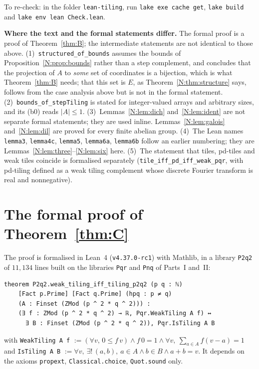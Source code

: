 \documentclass[11pt,a4paper]{amsart}
\theoremstyle{definition}
\theoremstyle{remark}
\newcommand{\lean}[1]{\texttt{#1}}
\begin{document}
\medskip
\noindent To re-check: in the folder \texttt{lean-tiling}, run \texttt{lake exe cache get}, \texttt{lake build}
and \texttt{lake env lean Check.lean}.

\medskip
{\sloppy\noindent\textbf{Where the text and the formal statements differ.} The formal proof is a proof of
Theorem~\ref{thm:B}; the intermediate statements are not identical to those above.
(1)~\lean{structured\_of\_bounds} assumes the bounds of Proposition~\ref{N:prop:bounds} rather than a step
complement, and concludes that the projection of $A$ to \emph{some} set of coordinates is a bijection, which is
what Theorem~\ref{thm:B} needs; that this set is $E$, as Theorem~\ref{N:thm:structure} says, follows from the
case analysis above but is not in the formal statement.
(2)~\lean{bounds\_of\_stepTiling} is stated for integer-valued arrays and arbitrary sizes, and its (b0) reads
$|A|\le 1$.
(3)~Lemmas~\ref{N:lem:dich} and~\ref{N:lem:ident} are not separate formal statements; they are used inline.
Lemmas~\ref{N:lem:galois} and~\ref{N:lem:dil} are proved for every finite abelian group.
(4)~The Lean names \lean{lemma3}, \lean{lemma4c}, \lean{lemma5}, \lean{lemma6a}, \lean{lemma6b} follow an earlier
numbering; they are Lemmas~\ref{N:lem:three}--\ref{N:lem:six} here.
(5)~The statement that tiles, pd-tiles and weak tiles coincide is formalised separately
(\lean{tile\_iff\_pd\_iff\_weak\_pqr}, with pd-tiling defined as a weak tiling complement whose discrete Fourier
transform is real and nonnegative).\par}

\section{The formal proof of Theorem~\ref{thm:C}}\label{C:sec:lean}

The proof is formalised in Lean~4 (\texttt{v4.37.0-rc1}) with Mathlib, in a library \lean{P2q2} of $11{,}134$
lines built on the libraries \lean{Pqr} and \lean{Pnq} of Parts~I and~II:
\begin{verbatim}
theorem P2q2.weak_tiling_iff_tiling_p2q2 (p q : ℕ)
    [Fact p.Prime] [Fact q.Prime] (hpq : p ≠ q)
    (A : Finset (ZMod (p ^ 2 * q ^ 2))) :
    (∃ f : ZMod (p ^ 2 * q ^ 2) → ℝ, Pqr.WeakTiling A f) ↔
      ∃ B : Finset (ZMod (p ^ 2 * q ^ 2)), Pqr.IsTiling A B
\end{verbatim}
with \lean{WeakTiling A f} $:=(\forall v,\,0\le f\,v)\wedge f\,0=1\wedge\forall v,\ \sum_{a\in A}f(v-a)=1$ and
\lean{IsTiling A B} $:=\forall v,\ \exists!\,(a,b),\ a\in A\wedge b\in B\wedge a+b=v$. It depends on the axioms
\lean{propext}, \lean{Classical.choice}, \lean{Quot.sound} only.
\end{document}
